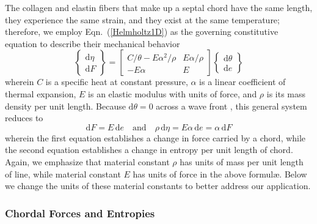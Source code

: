 The collagen and elastin fibers that make up a septal chord have the same length, they experience the same strain, and they exist at the same temperature; therefore, we employ Eqn.~(\ref{Helmholtz1D}) as the governing constitutive equation to describe their mechanical behavior
\begin{displaymath}
\left\{ \begin{matrix} 
\mathrm{d} \eta \\ \mathrm{d} F
\end{matrix} \right\} = \begin{bmatrix}
C / \theta - E \alpha^2 / \rho & E \alpha / \rho \\
-E \alpha & E
\end{bmatrix} \left\{ \begin{matrix}
\mathrm{d} \theta \\ \mathrm{d} e
\end{matrix} \right\} 
\end{displaymath}
wherein $C$ is a specific heat at constant pressure, $\alpha$ is a linear coefficient of thermal expansion, $E$ is an elastic modulus with units of force, and $\rho$ is its mass density per unit length.  Because $\mathrm{d} \theta = 0$ across a wave front \cite{AmesStaff53}, this general system reduces to
\begin{displaymath} 
\mathrm{d} F = E \, \mathrm{d}e
\quad \text{and} \quad
\rho \, \mathrm{d} \eta = E \alpha \, \mathrm{d}e = \alpha \, \mathrm{d}F
\end{displaymath} 
wherein the first equation establishes a change in force carried by a chord, while the second equation establishes a change in entropy per unit length of chord.  Again, we emphasize that material constant $\rho$ has units of mass per unit length of line, while material constant $E$ has units of force in the above formul\ae.   Below we change the units of these material constants to better address our application.

\subsubsection{Chordal Forces and Entropies}


